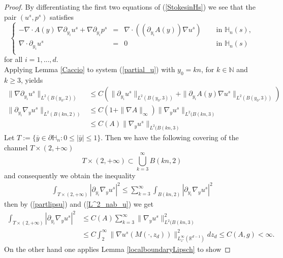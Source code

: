 \documentclass[11pt, reqno]{amsart}
\theoremstyle{definition}
\theoremstyle{remark}
\numberwithin{equation}{section}
\begin{document}
\begin{appendices}
\begin{proof}
	
	\noindent By differentiating the  first two equations of (\ref {StokesinHs})
	we see that the pair $(u^s,p^s)$  satisfies 
	\begin{equation}\label{partial_u}
		\left\{
		\begin{array}{rcll}
			-\nabla\cdot A (y) \: \nabla \partial_{y_i} u^s +  \nabla\partial_{y_i} p^s&=& \nabla\cdot( (\partial_{y_i} A(y) ) \nabla u^s) \;  \quad  &\mbox{in }  \mathbb{H}_n(s),\\
			\nabla\cdot\partial_{y_i} u^s&=& 0 \;  \qquad \qquad \qquad\qquad &\mbox{in }  \mathbb{H}_n(s) \\
		\end{array}
		\right. 
	\end{equation}
	for all $i=1,...,d$.\\
	\noindent Applying Lemma \ref{Caccio} to system (\ref{partial_u}) with $y_0=kn$, for $k\in \mathbb{N}$ and  $k\geq 3$,   yields
	\begin{align}
		\| \nabla \partial_{y_i} u^s \| _{L^2(B(y_0,2))}& \leq  C \left( \|   \partial_{y_i}u^s\|_{L^2(B(y_0,3))} + \|  \partial_{y_i} A(y)  \nabla u^s \|_{L^2(B(y_0,3))} \right)\nonumber\\ 
		\|\partial_{y_i} \nabla_y u^s\|_{L^2 (B(kn,2))}&\leq C (1+ \| \nabla A\|_{\infty} ) \|\nabla_y u^s\|_{L^2(B(kn,3)}\nonumber	\\
		&\leq C (A)\|\nabla_y u^s\|_{L^2(B(kn,3)}	\label{partlipsu}
	\end{align}
	Let $T:=\{ \bar{y}\in\partial\mathbb{H}_n: 0\leq | \bar{y}|\leq 1\}$. Then we have the following covering of the channel 
	$T\times (2,+\infty)$
	\begin{equation*}
		T\times (2,+\infty)	\subset \bigcup^\infty_{k=3} B(kn,2)
	\end{equation*}
	and consequently we obtain the inequality
	\begin{align*}
		\int_{T\times (2,+\infty)}|\partial_{y_i} \nabla_y u^s|^2	\leq  \sum^\infty_{k=3} \int_{B(kn,2)}|\partial_{y_i} \nabla_y u^s|^2
	\end{align*}
	then by (\ref{partlipsu}) and (\ref{L^2_nab_u}) we get 
	\begin{align*}
		\int_{T\times (2,+\infty)}|\partial_{y_i} \nabla_y u^s|^2
		&\leq C(A)\sum^\infty_{k=3}  \|\nabla_y u^s\|^2_{L^2(B(kn,3)}	\\
		&\leq C 	\int_{2}^\infty  \| \nabla u^s(M (\cdot,z_d))\|^2_{L_{z'}^\infty(\mathbb{R}^{d-1})} dz_d\leq C(A,g)<\infty.
	\end{align*}
	On the other hand one applies Lemma \ref{localboundaryLipsch} to show 

\end{proof}
\end{appendices}
\end{document}
